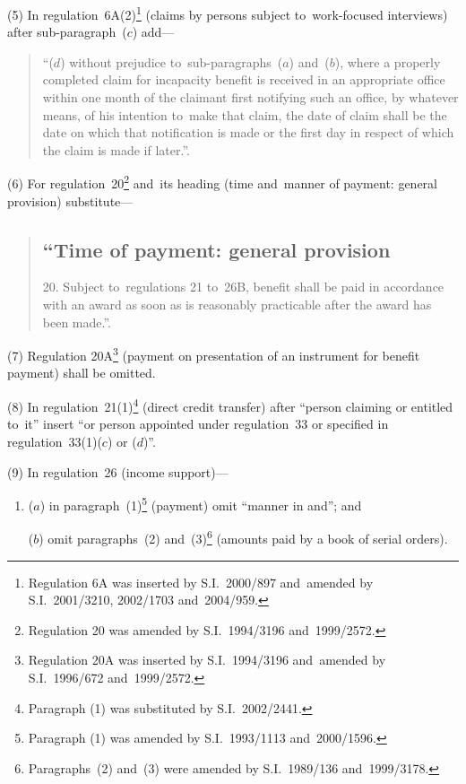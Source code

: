 \documentclass[12pt,a4paper]{article}
\begin{document}
(5) In regulation~6A(2)\footnote{Regulation 6A was inserted by S.I.~2000/897 and~amended by S.I.~2001/3210, 2002/1703 and~2004/959.} (claims by persons subject to~work-focused interviews) after sub-paragraph~($c$)  add—
\begin{quotation}
“($d$) without prejudice to~sub-paragraphs~($a$)  and~($b$), where a properly completed claim for incapacity benefit is received in an appropriate office within one month of the claimant first notifying such an office, by whatever means, of his intention to~make that claim, the date of claim shall be the date on which that notification is made or the first day in respect of which the claim is made if later.”.
\end{quotation}

(6) For regulation~20\footnote{Regulation 20 was amended by S.I.~1994/3196 and~1999/2572.} and~its heading (time and~manner of payment: general provision) substitute—
\begin{quotation}
\subsection*{“Time of payment: general provision}

20.  Subject to~regulations 21 to~26B, benefit shall be paid in accordance with an award as soon as is reasonably practicable after the award has been made.”.
\end{quotation}

(7) Regulation 20A\footnote{Regulation 20A was inserted by S.I.~1994/3196 and~amended by S.I.~1996/672 and~1999/2572.} (payment on presentation of an instrument for benefit payment) shall be omitted.

(8) In regulation~21(1)\footnote{Paragraph (1) was substituted by S.I.~2002/2441.} (direct credit transfer) after “person claiming or entitled to~it” insert “or person appointed under regulation~33 or specified in regulation~33(1)($c$)  or ($d$)”.

(9) In regulation~26 (income support)—
\begin{enumerate}\item[]
($a$) in paragraph~(1)\footnote{Paragraph (1) was amended by S.I.~1993/1113 and~2000/1596.} (payment) omit “manner in and”; and

($b$) omit paragraphs~(2) and~(3)\footnote{Paragraphs~(2) and~(3) were amended by S.I.~1989/136 and~1999/3178.} (amounts paid by a book of serial orders).
\end{enumerate}
\end{document}
